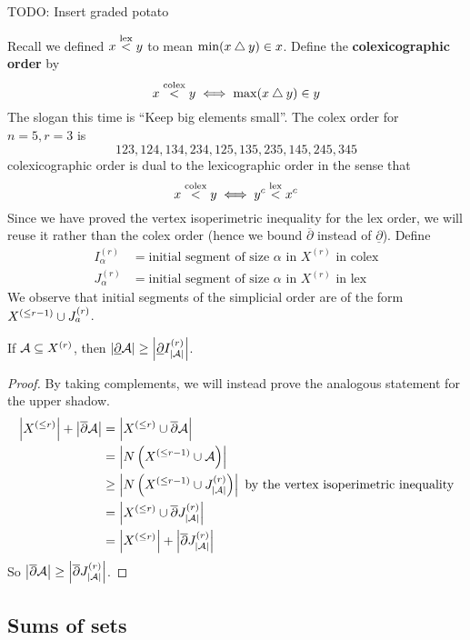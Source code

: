 \documentclass{article}
\begin{document}
TODO: Insert graded potato

\newlec

Recall we defined $x \overset{\text{lex}}< y$ to mean $\min(x \mathbin\varbigtriangleup y) \in x$. Define the {\bf colexicographic order} by
$$x \overset{\text{colex}}< y \iff \max(x \mathbin\varbigtriangleup y) \in y$$
The slogan this time is ``Keep big elements small''. The colex order for $n = 5, r = 3$ is
$$123, 124, 134, 234, 125, 135, 235, 145, 245, 345$$
colexicographic order is dual to the lexicographic order in the sense that
$$x \overset{\text{colex}}< y \iff y^c \overset{\text{lex}}< x^c$$
Since we have proved the vertex isoperimetric inequality for the lex order, we will reuse it rather than the colex order (hence we bound $\overline\partial$ instead of $\underline\partial$). Define
\begin{align*}
  I_\alpha^{(r)} & = \text{initial segment of size $\alpha$ in $X^{(r)}$ in colex} \\
  J_\alpha^{(r)} & = \text{initial segment of size $\alpha$ in $X^{(r)}$ in lex}
\end{align*}
We observe that initial segments of the simplicial order are of the form $X^{(\le r - 1)} \cup J_a^{(r)}$.

\begin{nthm}
  If $\mathcal A \subseteq X^{(r)}$, then $\left\lvert \underline\partial\mathcal A\right\rvert \ge \left\lvert \underline\partial I_{\left\lvert \mathcal A\right\rvert}^{(r)}\right\rvert$.
\end{nthm}
\begin{proof}
  By taking complements, we will instead prove the analogous statement for the upper shadow.
  \begin{align*}
    \left\lvert X^{(\le r)}\right\rvert + \left\lvert \overline\partial\mathcal A\right\rvert
    & = \left\lvert X^{(\le r)} \cup \overline\partial\mathcal A\right\rvert \\
    & = \left\lvert N\left(X^{(\le r - 1)} \cup \mathcal A\right)\right\rvert \\
    & \ge \left\lvert N\left(X^{(\le r - 1)} \cup J_{\left\lvert \mathcal A\right\rvert}^{(r)}\right)\right\rvert \text{ by the vertex isoperimetric inequality} \\
    & = \left\lvert X^{(\le r)} \cup \overline\partial J_{\left\lvert \mathcal A\right\rvert}^{(r)}\right\rvert \\
    & = \left\lvert X^{(\le r)}\right\rvert + \left\lvert \overline\partial J_{\left\lvert \mathcal A\right\rvert}^{(r)}\right\rvert
  \end{align*}
  So $\left\lvert \overline\partial\mathcal A\right\rvert \ge \left\lvert \overline\partial J_{\left\lvert \mathcal A\right\rvert}^{(r)}\right\rvert$.
\end{proof}

\clearpage

\subsection{Sums of sets}
\end{document}
